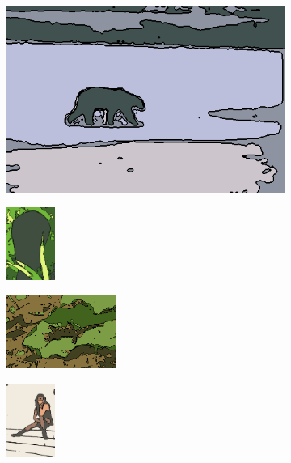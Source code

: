 \documentclass[journal]{IEEEtran}
\begin{document}
\begin{figure}[!ht]
    \begin{subfigure}[t]{\textwidth+20pt\relax}
    	\centering
    	\includegraphics[width=\dimexpr\linewidth-20pt\relax]{100007_MiniBatchKMeans_const_segm} 
    \end{subfigure}      
    \begin{subfigure}[b]{0.23\textwidth}
    	\centering
        \includegraphics[height=67.68857pt]{101084_MiniBatchKMeans_const_segm}
    \end{subfigure}
    \begin{subfigure}[b]{0.23\textwidth}
    	\centering
        \includegraphics[height=67.68857pt]{175083_MiniBatchKMeans_const_segm}
    \end{subfigure}
    \begin{subfigure}[b]{0.23\textwidth}
    	\centering
        \includegraphics[height=67.68857pt]{181021_MiniBatchKMeans_const_segm}
    \end{subfigure} \\ 
    

\end{figure}
\end{document}

